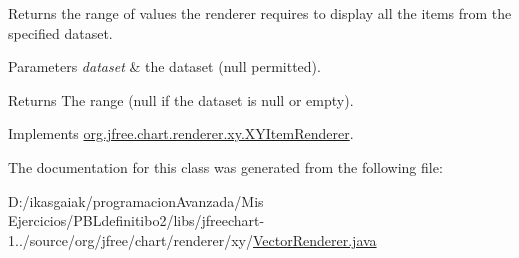 Returns the range of values the renderer requires to display all the items from the specified dataset.


\begin{DoxyParams}{Parameters}
{\em dataset} & the dataset ({\ttfamily null} permitted).\\
\hline
\end{DoxyParams}
\begin{DoxyReturn}{Returns}
The range ({\ttfamily null} if the dataset is {\ttfamily null} or empty). 
\end{DoxyReturn}


Implements \mbox{\hyperlink{interfaceorg_1_1jfree_1_1chart_1_1renderer_1_1xy_1_1_x_y_item_renderer_af9ac6f440e99c73d343de7851e89496a}{org.\+jfree.\+chart.\+renderer.\+xy.\+X\+Y\+Item\+Renderer}}.



The documentation for this class was generated from the following file\+:\begin{DoxyCompactItemize}
\item 
D\+:/ikasgaiak/programacion\+Avanzada/\+Mis Ejercicios/\+P\+B\+Ldefinitibo2/libs/jfreechart-\/1../source/org/jfree/chart/renderer/xy/\mbox{\hyperlink{_vector_renderer_8java}{Vector\+Renderer.\+java}}\end{DoxyCompactItemize}
